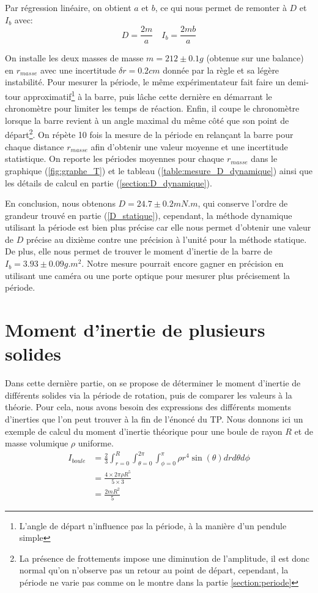 \documentclass[12pt]{article}
\begin{document}
Par régression linéaire, on obtient $a$ et $b$, ce qui nous permet de remonter à $D$ et $I_b$ avec:
\begin{equation}
    D = \frac{2m}{a} \quad I_b = \frac{2mb}{a}
\end{equation}

On installe les deux masses de masse $m = 212 \pm 0.1g$ (obtenue sur une balance) en $r_{masse}$ avec une incertitude $\delta r = 0.2cm$ donnée par la règle et sa légère instabilité.
Pour mesurer la période, le même expérimentateur fait faire un demi-tour approximatif\footnote{L'angle de départ n'influence pas la période, à la manière d'un pendule simple} à la barre,
puis lâche cette dernière en démarrant le chronomètre pour limiter les temps de réaction. Enfin, il coupe le chronomètre lorsque la barre revient à un angle maximal du même côté que son point de
départ\footnote{La présence de frottements impose une diminution de l'amplitude, il est donc normal qu'on n'observe pas un retour au point de départ, cependant, 
la période ne varie pas comme on le montre dans la partie \ref{section:periode}}. 
On répète 10 fois la mesure de la période en relançant la barre pour chaque distance $r_{masse}$ 
afin d'obtenir une valeur moyenne et une incertitude statistique. On reporte les périodes moyennes pour 
chaque $r_{masse}$ dans le graphique (\ref{fig:graphe_T}) et le tableau (\ref{table:mesure_D_dynamique}) ainsi que les détails de calcul en 
partie (\ref{section:D_dynamique}).

En conclusion, nous obtenons $D = 24.7 \pm 0.2 mN.m$, qui conserve l'ordre de grandeur trouvé en partie (\ref{D_statique}), cependant, la méthode
dynamique utilisant la période est bien plus précise car elle nous permet d'obtenir une valeur de $D$ précise au dixième contre une précision
à l'unité pour la méthode statique. De plus, elle nous permet de trouver le moment d'inertie de la barre de $I_b = 3.93 \pm 0.09g.m^2$. Notre mesure pourrait
encore gagner en précision en utilisant une caméra ou une porte optique pour mesurer plus précisement la période.

\break



\section{Moment d'inertie de plusieurs solides}
Dans cette dernière partie, on se propose de déterminer le moment d'inertie de différents solides via la période
de rotation, puis de comparer les valeurs à la théorie. Pour cela, nous avons besoin des expressions des différents moments d'inerties que l'on peut trouver à la fin de l'énoncé
du TP. Nous donnons ici un exemple de calcul du moment d'inertie théorique pour une boule de rayon $R$ et de masse volumique $\rho$ uniforme.
\begin{align}
    I_{boule}   & = \frac{2}{3} \int_{r=0}^{R}\int_{\theta=0}^{2\pi}\int_{\phi=0}^{\pi} \rho r^4 \sin(\theta) dr d\theta d\phi \\
                & = \frac{4 \times 2\pi \rho R^5}{5 \times 3} \\
                & = \frac{2mR^2}{5}
\end{align}
\end{document}
